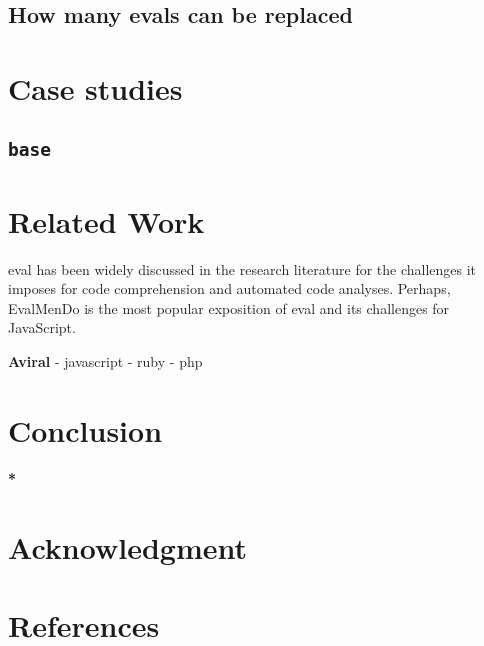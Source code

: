 \documentclass[conference]{IEEEtran}
\begin{document}
\subsection{How many evals can be replaced}

\section{Case studies}

\subsection{\texttt{base}}

\section{Related Work}
eval has been widely discussed in the research literature for the challenges it
imposes for code comprehension and automated code analyses.
Perhaps, EvalMenDo is the most popular exposition of eval and its
challenges for JavaScript. 

\textbf{Aviral}
- javascript
- ruby
- php

\section{Conclusion}
\textbf{*}


\section*{Acknowledgment}

\section*{References}
\end{document}
